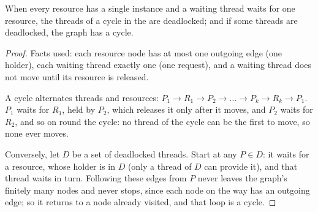 \begin{omfigure}
\par{}
\end{omfigure}

\begin{theorem}\label{thm:b3:concurrency:cycle}
When every resource has a single instance and a waiting thread waits for one resource, the threads of a cycle in the  are deadlocked; and if some threads are deadlocked, the graph has a cycle.
\end{theorem}

\begin{proof}
Facts used: each resource node has at most one outgoing edge (one holder), each waiting thread exactly one (one request), and a waiting thread does not move until its resource is released.

A cycle alternates threads and resources: $P_1 \to R_1 \to P_2 \to \dots \to P_k \to R_k \to P_1$. $P_1$ waits for $R_1$, held by $P_2$, which releases it only after it moves, and $P_2$ waits for $R_2$, and so on round the cycle: no thread of the cycle can be the first to move, so none ever moves.

Conversely, let $D$ be a set of deadlocked threads. Start at any $P \in D$: it waits for a resource, whose holder is in $D$ (only a thread of $D$ can provide it), and that thread waits in turn. Following these edges from $P$ never leaves the graph's finitely many nodes and never stops, since each node on the way has an outgoing edge; so it returns to a node already visited, and that loop is a cycle.
\end{proof}

